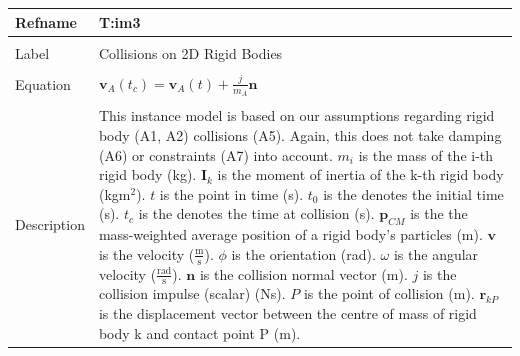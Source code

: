 \documentclass[12pt]{article}
\begin{document}
\noindent \begin{minipage}{\textwidth}
\begin{tabular}{p{} p{}}
\toprule \textbf{Refname} & \textbf{T:im3}
\label{T:im3}
\\ \midrule \\
Label & Collisions on 2D Rigid Bodies
\\ \midrule \\
Equation & ${\mathbf{v}_{A}}\left({t_{c}}\right)={\mathbf{v}_{A}}\left(t\right)+\frac{j}{{m_{A}}} \mathbf{n}$
\\ \midrule \\
Description & This instance model is based on our assumptions regarding rigid body (A1, A2) collisions (A5). Again, this does not take damping (A6) or constraints (A7) into account. ${m_{i}}$ is the mass of the i-th rigid body (kg). ${\mathbf{I}_{k}}$ is the moment of inertia of the k-th rigid body (kg$\text{m}^{2}$). $t$ is the point in time (s). ${t_{0}}$ is the denotes the initial time (s). ${t_{c}}$ is the denotes the time at collision (s). ${\mathbf{p}_{CM}}$ is the the mass-weighted average position of a rigid body's particles (m). $\mathbf{v}$ is the velocity ($\frac{\text{m}}{\text{s}}$). $ϕ$ is the orientation (rad). $ω$ is the angular velocity ($\frac{\text{rad}}{\text{s}}$). $\mathbf{n}$ is the collision normal vector (m). $j$ is the collision impulse (scalar) (Ns). $P$ is the point of collision (m). ${\mathbf{r}_{kP}}$ is the displacement vector between the centre of mass of rigid body k and contact point P (m).
\\ \bottomrule \end{tabular}
\end{minipage}\\
\end{document}
